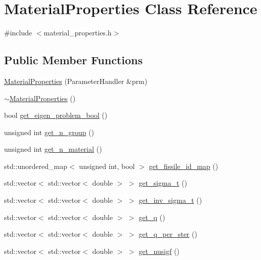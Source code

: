 \hypertarget{class_material_properties}{}\section{Material\+Properties Class Reference}
\label{class_material_properties}


{\ttfamily \#include $<$material\+\_\+properties.\+h$>$}

\subsection*{Public Member Functions}
\begin{DoxyCompactItemize}
\item 
\hyperlink{class_material_properties_a9c1a2ff5f7cfaacd4b992e96186fbf81}{Material\+Properties} (Parameter\+Handler \&prm)
\item 
\hyperlink{class_material_properties_aab94335e9db402f624b88603b233bcab}{$\sim$\+Material\+Properties} ()
\item 
bool \hyperlink{class_material_properties_af12005ec9e915a626afd93890c4f7b3a}{get\+\_\+eigen\+\_\+problem\+\_\+bool} ()
\item 
unsigned int \hyperlink{class_material_properties_ab78d4abe8fba20919d0a8d7700de0763}{get\+\_\+n\+\_\+group} ()
\item 
unsigned int \hyperlink{class_material_properties_a2a43f90684a6f2ad0b32e10384e13254}{get\+\_\+n\+\_\+material} ()
\item 
std\+::unordered\+\_\+map$<$ unsigned int, bool $>$ \hyperlink{class_material_properties_ae04d6676e685d374cb82a15a6b45d96b}{get\+\_\+fissile\+\_\+id\+\_\+map} ()
\item 
std\+::vector$<$ std\+::vector$<$ double $>$ $>$ \hyperlink{class_material_properties_ada6ea8094dfc4b5c9610c6dc8d54a47a}{get\+\_\+sigma\+\_\+t} ()
\item 
std\+::vector$<$ std\+::vector$<$ double $>$ $>$ \hyperlink{class_material_properties_a319b2dd1caaa13cc9b1afc9ace17e218}{get\+\_\+inv\+\_\+sigma\+\_\+t} ()
\item 
std\+::vector$<$ std\+::vector$<$ double $>$ $>$ \hyperlink{class_material_properties_a0bbf8a7d69c73288b015b4247ab0451c}{get\+\_\+q} ()
\item 
std\+::vector$<$ std\+::vector$<$ double $>$ $>$ \hyperlink{class_material_properties_a3903e07c80bfe939a3a70be59c74bc53}{get\+\_\+q\+\_\+per\+\_\+ster} ()
\item 
std\+::vector$<$ std\+::vector$<$ double $>$ $>$ \hyperlink{class_material_properties_a75afcc7707f4d77aedf439bacacbfb51}{get\+\_\+nusigf} ()

\end{DoxyCompactItemize}
